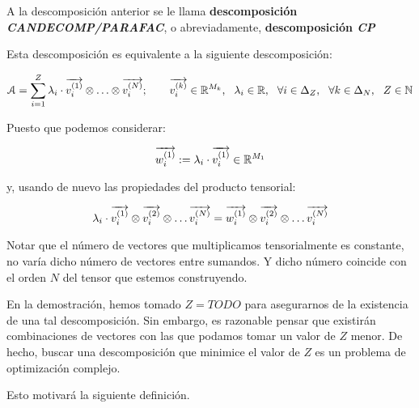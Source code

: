 A la descomposición anterior se le llama \textbf{descomposición \textit{CANDECOMP/PARAFAC}}, o abreviadamente, \textbf{descomposición \textit{CP}}

\begin{observacion}
    Esta descomposición es equivalente a la siguiente descomposición:

    \begin{equation}
        \mathcal{A} = \sum_{i = 1}^Z \lambda_i \cdot \overrightarrow{v_i^{(1)}} \otimes \ldots \otimes \overrightarrow{v_i^{(N)}};
        \qquad \overrightarrow{v_i^{(k)}} \in \mathbb{R}^{M_k},
        \ \  \lambda_i \in \mathbb{R},
        \ \  \forall i \in \Delta_{Z},
        \ \  \forall k \in \Delta_{N},
        \ \  Z \in \mathbb{N}
    \end{equation}

    Puesto que podemos considerar:

    \begin{equation}
        \overrightarrow{w_i^{(1)}} := \lambda_i \cdot \overrightarrow{v_i^{(1)}} \in \mathbb{R}^{M_1}
    \end{equation}

    y, usando de nuevo las propiedades del producto tensorial:

    \begin{equation}
        \lambda_i \cdot \overrightarrow{v_i^{(1)}} \otimes \overrightarrow{v_i^{(2)}} \otimes \ldots \overrightarrow{v_i^{(N)}} = \overrightarrow{w_i^{(1)}} \otimes \overrightarrow{v_i^{(2)}} \otimes \ldots \overrightarrow{v_i^{(N)}}
    \end{equation}
\end{observacion}

\begin{observacion}
    Notar que el número de vectores que multiplicamos tensorialmente es constante, no varía dicho número de vectores entre sumandos. Y dicho número coincide con el orden $N$ del tensor que estemos construyendo.
\end{observacion}

\begin{observacion}

    En la demostración, hemos tomado $Z = TODO$ para asegurarnos de la existencia de una tal descomposición. Sin embargo, es razonable pensar que existirán combinaciones de vectores con las que podamos tomar un valor de $Z$ menor. De hecho, buscar una descomposición que minimice el valor de $Z$ es un problema de optimización complejo.

    Esto motivará la siguiente definición.
\end{observacion}

